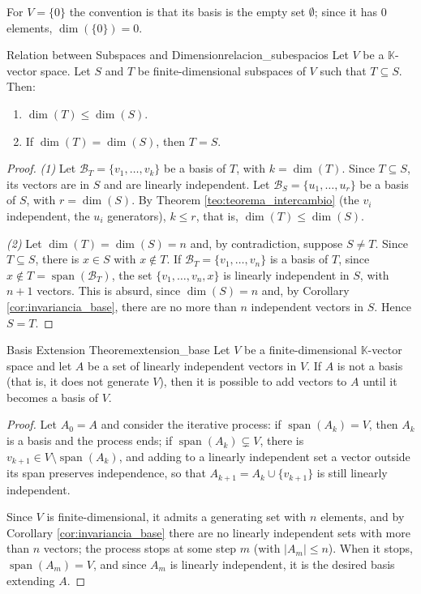 \documentclass[11pt, a4paper]{article}
\begin{document}
\obs For $V = \{0\}$ the convention is that its basis is the empty set $\emptyset$; since it has $0$ elements, $\dim(\{0\}) = 0$.

\begin{proposicion}{Relation between Subspaces and Dimension}{relacion_subespacios}
Let $V$ be a $\mathbb{K}$-vector space. Let $S$ and $T$ be finite-dimensional subspaces of $V$ such that $T \subseteq S$. Then:
\begin{enumerate}
    \item $\dim(T) \le \dim(S)$.
    \item If $\dim(T) = \dim(S)$, then $T = S$.
\end{enumerate}
\end{proposicion}

\begin{proof}
\textit{(1)} Let $\mathcal{B}_T = \{v_1, \dots, v_k\}$ be a basis of $T$, with $k = \dim(T)$. Since $T \subseteq S$, its vectors are in $S$ and are linearly independent. Let $\mathcal{B}_S = \{u_1, \dots, u_r\}$ be a basis of $S$, with $r = \dim(S)$. By Theorem \ref{teo:teorema_intercambio} (the $v_i$ independent, the $u_i$ generators), $k \le r$, that is, $\dim(T) \le \dim(S)$.

\textit{(2)} Let $\dim(T) = \dim(S) = n$ and, by contradiction, suppose $S \neq T$. Since $T \subseteq S$, there is $x \in S$ with $x \notin T$. If $\mathcal{B}_T = \{v_1, \dots, v_n\}$ is a basis of $T$, since $x \notin T = \operatorname{span}(\mathcal{B}_T)$, the set $\{v_1, \dots, v_n, x\}$ is linearly independent in $S$, with $n+1$ vectors. This is absurd, since $\dim(S) = n$ and, by Corollary \ref{cor:invariancia_base}, there are no more than $n$ independent vectors in $S$. Hence $S = T$.
\end{proof}

\begin{teorema}{Basis Extension Theorem}{extension_base}
Let $V$ be a finite-dimensional $\mathbb{K}$-vector space and let $A$ be a set of linearly independent vectors in $V$.
If $A$ is not a basis (that is, it does not generate $V$), then it is possible to add vectors to $A$ until it becomes a basis of $V$.
\end{teorema}

\begin{proof}
Let $A_0 = A$ and consider the iterative process: if $\operatorname{span}(A_k) = V$, then $A_k$ is a basis and the process ends; if $\operatorname{span}(A_k) \subsetneq V$, there is $v_{k+1} \in V \setminus \operatorname{span}(A_k)$, and adding to a linearly independent set a vector outside its span preserves independence, so that $A_{k+1} = A_k \cup \{v_{k+1}\}$ is still linearly independent.

Since $V$ is finite-dimensional, it admits a generating set with $n$ elements, and by Corollary \ref{cor:invariancia_base} there are no linearly independent sets with more than $n$ vectors; the process stops at some step $m$ (with $|A_m| \le n$). When it stops, $\operatorname{span}(A_m) = V$, and since $A_m$ is linearly independent, it is the desired basis extending $A$.
\end{proof}
\end{document}
